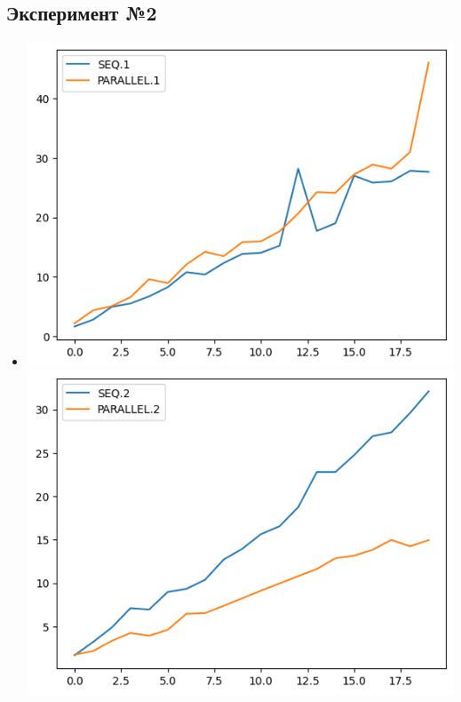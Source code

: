 \documentclass[10pt, a4paper]{article}
\begin{document}
\subsection*{Эксперимент №2}
\begin{itemize}
    \item \includegraphics[scale=0.6]{graphs/5.png}
    \includegraphics[scale=0.6]{graphs/6.png}


\end{itemize}
\end{document}
